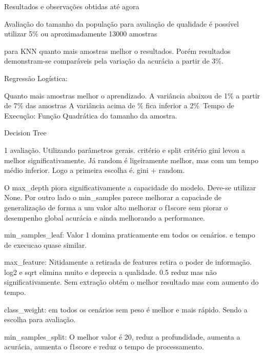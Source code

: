 Resultados e observações obtidas até agora


Avaliação do tamanho da população
para avaliação de qualidade é possível utilizar 5\% ou aproximadamente 13000 amostras

para KNN quanto mais amostras melhor o resultados.  Porém resultados demonstram-se comparáveis pela variação da acurácia a partir de 3\%.

Regressão Logística:

Quanto mais amostras melhor o aprendizado.  A variância abaixou de 1\% a partir de 7\% das amostras
A variância acima de \2\% fica inferior a 2\%\
Tempo de Execução:  Função Quadrática do tamanho da amostra.

Decision Tree

1 avaliação.
Utilizando parâmetros gerais.
critério e split
critério gini levou a melhor significativamente.
Já random é ligeiramente melhor, mas com um tempo médio inferior.  Logo a primeira escolha é.
gini + random.

O max\_depth piora significativamente a capacidade do modelo.
Deve-se utilizar None.
Por outro lado o min\_samples parece melhorar a capaciade de generalização de forma a um valor alto melhorar o f1score sem piorar o desempenho global acurácia e ainda melhorando a performance.


min\_samples\_leaf:  Valor 1 domina praticamente em todos os cenários.  e tempo de execucao quase similar.

max\_feature:  Nitidamente a retirada de features retira o poder de informação.
log2 e sqrt elimina muito e deprecia a qualidade.
0.5 reduz mas não significativamente.
Sem extração obtém o melhor resultado mas com aumento do tempo.

class\_weight: em todos os cenários sem peso é melhor e mais rápido.  Sendo a escolha para avaliação.

min\_samples\_split:  O melhor valor é 20, reduz a profundidade, aumenta a acurácia, aumenta o f1score e reduz o tempo de processamento.




